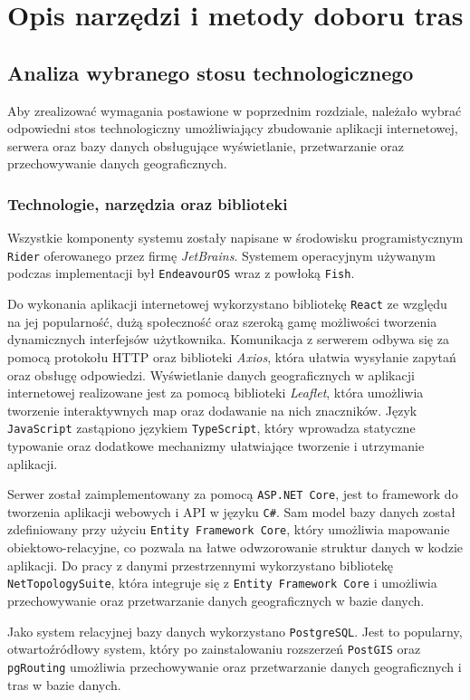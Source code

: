 \chapter{Opis narzędzi i metody doboru tras}
\section{Analiza wybranego stosu technologicznego}
Aby zrealizować wymagania postawione w poprzednim rozdziale, należało wybrać odpowiedni stos technologiczny umożliwiający zbudowanie aplikacji internetowej, 
serwera oraz bazy danych obsługujące wyświetlanie, przetwarzanie oraz przechowywanie danych geograficznych.
\subsection{Technologie, narzędzia oraz biblioteki}
Wszystkie komponenty systemu zostały napisane w środowisku programistycznym \texttt{Rider} oferowanego przez firmę \emph{JetBrains}.
Systemem operacyjnym używanym podczas implementacji był \texttt{EndeavourOS} wraz z powłoką \texttt{Fish}.

Do wykonania aplikacji internetowej wykorzystano bibliotekę \texttt{React} ze względu na jej popularność, dużą społeczność oraz szeroką gamę możliwości tworzenia dynamicznych interfejsów użytkownika.
Komunikacja z serwerem odbywa się za pomocą protokołu HTTP oraz biblioteki \emph{Axios}, która ułatwia wysyłanie zapytań oraz obsługę odpowiedzi.
Wyświetlanie danych geograficznych w aplikacji internetowej realizowane jest za pomocą biblioteki \emph{Leaflet}, która umożliwia tworzenie interaktywnych map oraz dodawanie na nich znaczników.
Język \texttt{JavaScript} zastąpiono językiem \texttt{TypeScript}, który wprowadza statyczne typowanie oraz dodatkowe mechanizmy ułatwiające tworzenie i utrzymanie aplikacji.

Serwer został zaimplementowany za pomocą \texttt{ASP.NET Core}, jest to framework do tworzenia aplikacji webowych i API w języku \texttt{C\#}.
Sam model bazy danych został zdefiniowany przy użyciu \texttt{Entity Framework Core}, który umożliwia mapowanie obiektowo-relacyjne, co pozwala na łatwe odwzorowanie struktur danych w kodzie aplikacji.
Do pracy z danymi przestrzennymi wykorzystano bibliotekę \texttt{NetTopologySuite}, która integruje się z \texttt{Entity Framework Core} i umożliwia przechowywanie oraz przetwarzanie danych geograficznych w bazie danych.

Jako system relacyjnej bazy danych wykorzystano \texttt{PostgreSQL}. 
Jest to popularny, otwartoźródłowy system, który po zainstalowaniu rozszerzeń \texttt{PostGIS} oraz \texttt{pgRouting} umożliwia przechowywanie oraz przetwarzanie danych geograficznych i tras w bazie danych.

